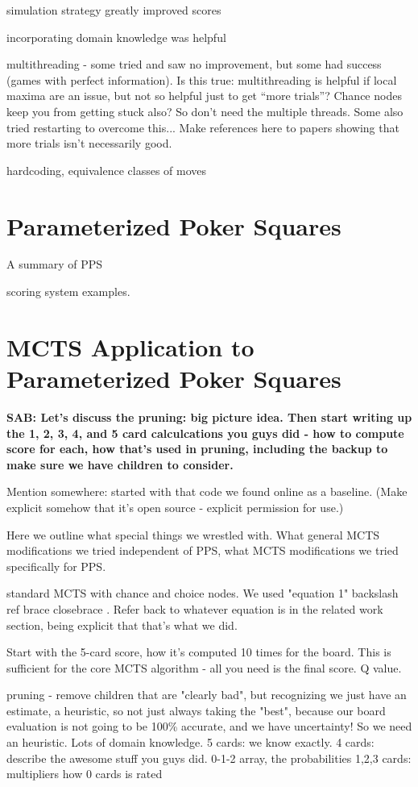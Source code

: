 \documentclass[letterpaper]{article}
\begin{document}
simulation strategy greatly improved scores

incorporating domain knowledge was helpful

multithreading - some tried and saw no improvement, but some had success (games with perfect information). Is this true: multithreading is helpful if local maxima are an issue, but not so helpful just to get ``more trials''? Chance nodes keep you from getting stuck also? So don't need the multiple threads. Some also tried restarting to overcome this... Make references here to papers showing that more trials isn't necessarily good.

hardcoding, equivalence classes of moves

\section{Parameterized Poker Squares}

A summary of PPS

scoring system examples.

\section{MCTS Application to Parameterized Poker Squares}
{\bf SAB: Let's discuss the pruning: big picture idea. Then start writing up the 1, 2, 3, 4, and 5 card calculcations you guys did - how to compute score for each, how that's used in pruning, including the backup to make sure we have children to consider.}

Mention somewhere: started with that code we found online as a baseline. (Make explicit somehow that it's open source - explicit permission for use.)

Here we outline what special things we wrestled with. What general MCTS modifications we tried independent of PPS, what MCTS modifications we tried specifically for PPS.

standard MCTS with chance and choice nodes. We used "equation 1"   backslash ref brace  closebrace   . Refer back to whatever equation is in the related work section, being explicit that that's what we did.

Start with the 5-card score, how it's computed 10 times for the board. This is sufficient for the core MCTS algorithm - all you need is the final score. Q value.

pruning - remove children that are "clearly bad", but recognizing we just have an estimate, a heuristic, so not just always taking the "best", because our board evaluation is not going to be 100\% accurate, and we have uncertainty! So we need an heuristic. Lots of domain knowledge.
5 cards: we know exactly.
4 cards: describe the awesome stuff you guys did. 0-1-2 array, the probabilities
1,2,3 cards: multipliers
how 0 cards is rated
\end{document}

